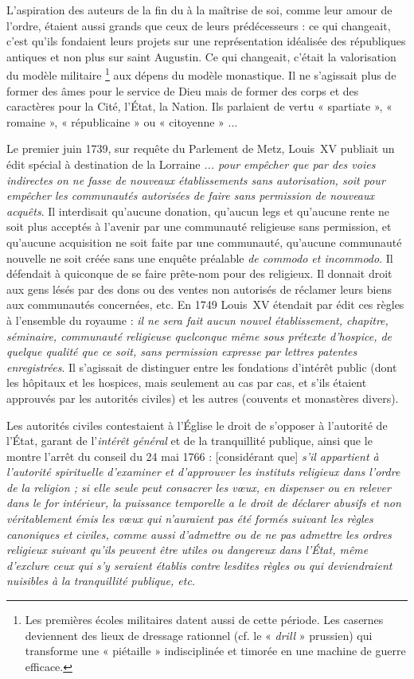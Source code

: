  L'aspiration des auteurs de la fin du  à la maîtrise de soi, comme leur amour de l'ordre, étaient aussi grands que ceux de leurs prédécesseurs : ce qui changeait, c'est qu'ils fondaient leurs projets sur une représentation idéalisée des républiques antiques et non plus sur saint Augustin. Ce qui changeait, c'était la valorisation du modèle militaire%
\footnote{Les premières écoles militaires datent aussi de cette période. Les casernes deviennent des lieux de dressage rationnel (cf. le « \emph{drill} » prussien) qui transforme une « piétaille » indisciplinée et timorée en une machine de guerre efficace.} 
aux dépens du modèle monastique. Il ne s'agissait plus de former des âmes pour le service de Dieu mais de former des corps et des caractères pour la Cité, l'État, la Nation. Ils parlaient de vertu « spartiate », « romaine », « républicaine » ou « citoyenne » ...

 Le premier juin 1739, sur requête du Parlement de Metz, Louis~XV publiait un édit spécial à destination de la Lorraine \emph{... pour empêcher que par des voies indirectes on ne fasse de nouveaux établissements sans autorisation, soit pour empêcher les communautés autorisées de faire sans permission de nouveaux acquêts}. Il interdisait qu'aucune donation, qu'aucun legs et qu'aucune rente ne soit plus acceptés à l'avenir par une communauté religieuse sans permission, et qu'aucune acquisition ne soit faite par une communauté, qu'aucune communauté nouvelle ne soit créée sans une enquête préalable \emph{de commodo et incommodo}. Il défendait à quiconque de se faire prête-nom pour des religieux. Il donnait droit aux gens lésés par des dons ou des ventes non autorisés de réclamer leurs biens aux communautés concernées, etc. En 1749 Louis~XV étendait par édit ces règles à l'ensemble du royaume : \emph{il ne sera fait aucun nouvel établissement, chapitre, séminaire, communauté religieuse quelconque même sous prétexte d'hospice, de quelque qualité que ce soit, sans permission expresse par lettres patentes enregistrées}. Il s'agissait de distinguer entre les fondations d'intérêt public (dont les hôpitaux et les hospices, mais seulement au cas par cas, et s'ils étaient approuvés par les autorités civiles) et les autres (couvents et monastères divers). 

 Les autorités civiles contestaient à l'Église le droit de s'opposer à l'autorité de l'État, garant de l'\emph{intérêt général} et de la tranquillité publique, ainsi que le montre l'arrêt du conseil du 24 mai 1766 : [considérant que] \emph{s'il appartient à l'autorité spirituelle d'examiner et d'approuver les instituts religieux dans l'ordre de la religion ; si elle seule peut consacrer les vœux, en dispenser ou en relever dans le for intérieur, la puissance temporelle a le droit de déclarer abusifs et non véritablement émis les vœux qui n'auraient pas été formés suivant les règles canoniques et civiles, comme aussi d'admettre ou de ne pas admettre les ordres religieux suivant qu'ils peuvent être utiles ou dangereux dans l'État, même d'exclure ceux qui s'y seraient établis contre lesdites règles ou qui deviendraient nuisibles à la tranquillité publique, etc.}

